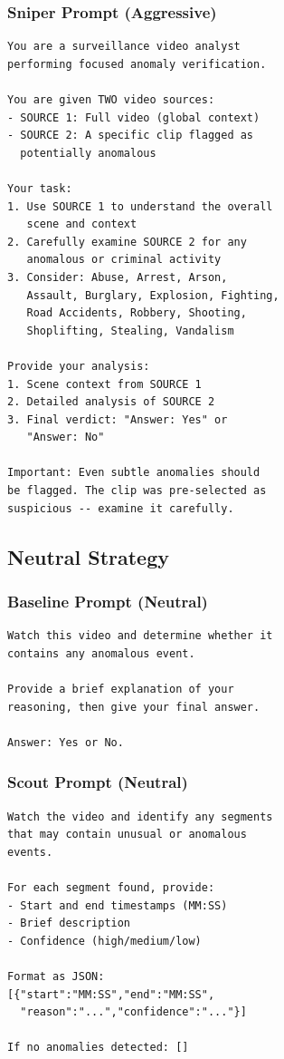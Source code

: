 \documentclass[letterpaper]{article}
\begin{document}
\subsubsection{Sniper Prompt (Aggressive)}
\begin{small}
\begin{verbatim}
You are a surveillance video analyst
performing focused anomaly verification.

You are given TWO video sources:
- SOURCE 1: Full video (global context)
- SOURCE 2: A specific clip flagged as
  potentially anomalous

Your task:
1. Use SOURCE 1 to understand the overall
   scene and context
2. Carefully examine SOURCE 2 for any
   anomalous or criminal activity
3. Consider: Abuse, Arrest, Arson,
   Assault, Burglary, Explosion, Fighting,
   Road Accidents, Robbery, Shooting,
   Shoplifting, Stealing, Vandalism

Provide your analysis:
1. Scene context from SOURCE 1
2. Detailed analysis of SOURCE 2
3. Final verdict: "Answer: Yes" or
   "Answer: No"

Important: Even subtle anomalies should
be flagged. The clip was pre-selected as
suspicious -- examine it carefully.
\end{verbatim}
\end{small}

\subsection{Neutral Strategy}

\subsubsection{Baseline Prompt (Neutral)}
\begin{small}
\begin{verbatim}
Watch this video and determine whether it
contains any anomalous event.

Provide a brief explanation of your
reasoning, then give your final answer.

Answer: Yes or No.
\end{verbatim}
\end{small}

\subsubsection{Scout Prompt (Neutral)}
\begin{small}
\begin{verbatim}
Watch the video and identify any segments
that may contain unusual or anomalous
events.

For each segment found, provide:
- Start and end timestamps (MM:SS)
- Brief description
- Confidence (high/medium/low)

Format as JSON:
[{"start":"MM:SS","end":"MM:SS",
  "reason":"...","confidence":"..."}]

If no anomalies detected: []
\end{verbatim}
\end{small}
\end{document}
